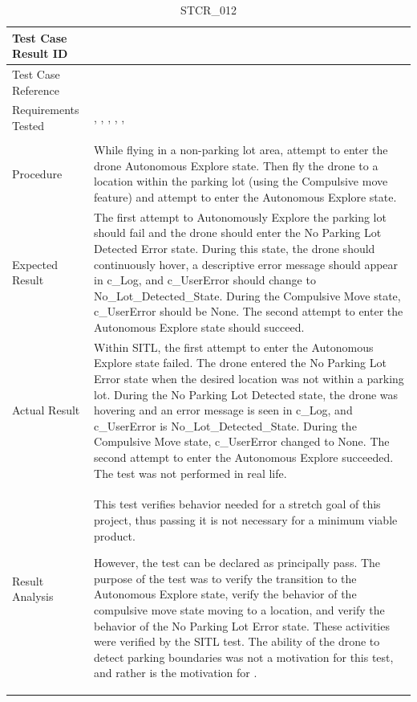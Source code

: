 \documentclass[12pt, titlepage]{article}
\begin{document}
\begin{table}[!h]
\begin{center}
\caption {STCR\_012}
\label{tab:STCR_012}
\begin{tabular}{ | m{3.2cm} | m{12.2cm} | } 
\hline
Test Case Result ID & \nameref{tab:STCR_012} \\ 
\hline
Test Case Reference & \nameref{tab:STC_012}  \\ 
\hline
Requirements Tested & \nameref{STA_003}, \nameref{TRANS_004}, \nameref{STA_011}, \nameref{TRANS_012}, \nameref{STA_008}, \nameref{TRANS_008} \\ 

\\ 
\hline
Procedure & While flying in a non-parking lot area, attempt to enter the drone Autonomous Explore state. Then fly the drone to a location within the parking lot (using the Compulsive move feature) and attempt to enter the Autonomous Explore state.     \\
\hline
Expected Result & The first attempt to Autonomously Explore the parking lot should fail and the drone should enter the No Parking Lot Detected Error state. During this state, the drone should continuously hover, a descriptive error message should appear in c\_Log, and c\_UserError should change to No_Lot_Detected_State. During the Compulsive Move state, c_UserError should be None. The second attempt to enter the Autonomous Explore state should succeed.   \\ 
\hline
Actual Result & Within SITL, the first attempt to enter the Autonomous Explore state failed. The drone entered the No Parking Lot Error state when the desired location was not within a parking lot. During the No Parking Lot Detected state, the drone was hovering and an error message is seen in c\_Log, and c\_UserError is No_Lot_Detected_State. During the Compulsive Move state, c_UserError changed to None. The second attempt to enter the Autonomous Explore succeeded. The test was not performed in real life.  \\
\hline
Result Analysis & This test verifies behavior needed for a stretch goal of this project, thus passing it is not necessary for a minimum viable product. 

However, the test can be declared as principally pass. The purpose of the test was to verify the transition to the Autonomous Explore state, verify the behavior of the compulsive move state moving to a location, and verify the behavior of the No Parking Lot Error state. These activities were verified by the SITL test. The ability of the drone to detect parking boundaries was not a motivation for this test, and rather is the motivation for \nameref{tab:STC_014}. 

\\ 
\hline
\end{tabular}
\end{center}
\end{table}
\end{document}
